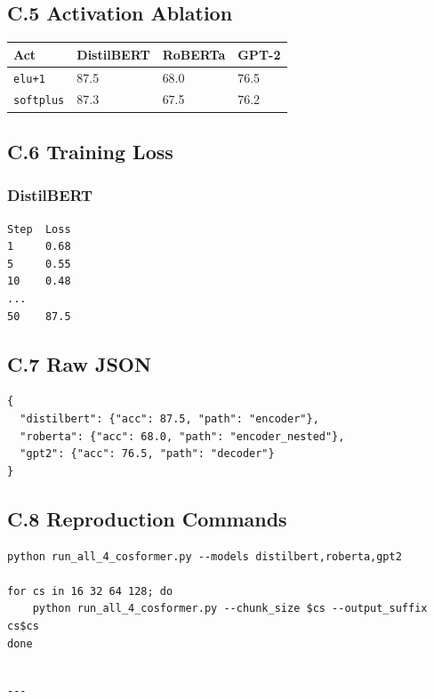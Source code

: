 \subsection{C.5 Activation Ablation}

\begin{table}[H]
\centering
\small
\begin{tabular}{llll}
\toprule
\textbf{Act} & \textbf{DistilBERT} & \textbf{RoBERTa} & \textbf{GPT-2} \\
\midrule
\texttt{elu+1} & 87.5 & 68.0 & 76.5 \\
\texttt{softplus} & 87.3 & 67.5 & 76.2 \\
\bottomrule
\end{tabular}
\end{table}

\subsection{C.6 Training Loss}

\subsubsection{DistilBERT}

\begin{lstlisting}
Step  Loss
1     0.68
5     0.55
10    0.48
...
50    87.5
\end{lstlisting}

\subsection{C.7 Raw JSON}

\begin{lstlisting}
{
  "distilbert": {"acc": 87.5, "path": "encoder"},
  "roberta": {"acc": 68.0, "path": "encoder_nested"},
  "gpt2": {"acc": 76.5, "path": "decoder"}
}
\end{lstlisting}

\subsection{C.8 Reproduction Commands}

\begin{lstlisting}
python run_all_4_cosformer.py --models distilbert,roberta,gpt2

for cs in 16 32 64 128; do
    python run_all_4_cosformer.py --chunk_size $cs --output_suffix cs$cs
done
\end{lstlisting}
\begin{lstlisting}

---
\end{lstlisting}


